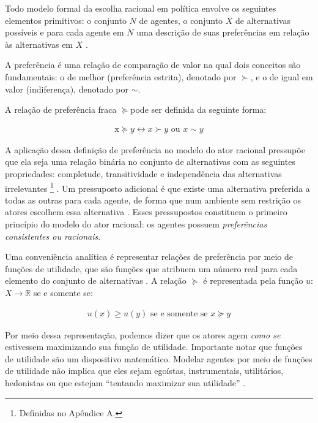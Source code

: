 Todo modelo formal da escolha racional em política envolve os seguintes
elementos primitivos: o conjunto $N$ de agentes, o conjunto \(X\) de
alternativas possíveis e para cada agente em \(N\) uma descrição de suas
preferências em relação às alternativas em \(X\) \cite[p.
263]{austen1998social}.

A preferência é uma relação de comparação de valor na qual dois conceitos são
fundamentais: o de melhor (preferência estrita), denotado por \(\succ\), e o de
igual em valor (indiferença), denotado por \(\sim\).

A relação de preferência fraca \( \succeq \)pode ser definida da seguinte forma:

\begin{align*}
  \text{x} \succeq y \leftrightarrow x \succ y \text{ ou } x \sim y
\end{align*}

A aplicação dessa definição de preferência no modelo do ator racional pressupõe
que ela seja uma relação binária no conjunto de alternativas com as seguintes
propriedades: completude, transitividade e independência das alternativas
irrelevantes \footnote{Definidas no Apêndice A.} \cite{gintis2016individuality,
  binmore2008rational}. Um pressuposto adicional é que existe uma alternativa
preferida a todas as outras para cada agente, de forma que num ambiente sem
restrição os atores escolhem essa alternativa \cite{gintis2016individuality}.
Esses pressupostos constituem o primeiro princípio do modelo do ator racional:
os agentes possuem \textit{preferências consistentes ou racionais}.

Uma conveniência analítica é representar relações de preferência por meio de
funções de utilidade, que são funções que atribuem um número real para cada
elemento do conjunto de alternativas \cite{sep-preferences}. A relação \( \succeq\) é
representada pela função \(u\): \(X \longrightarrow \mathbb{R}\) se e somente se:

\begin{align*}
  u(x) \geq u(y)
  \text{ se e somente se }
  x \succeq y
\end{align*}

Por meio dessa representação, podemos dizer que os atores agem \textit{como se}
estivessem maximizando sua função de utilidade. Importante notar que funções de
utilidade são um dispositivo matemático. Modelar agentes por meio de funções de
utilidade não implica que eles sejam egoístas, instrumentais, utilitários,
hedonistas ou que estejam ``tentando maximizar sua utilidade''
\cite{gaus2007philosophy}.

